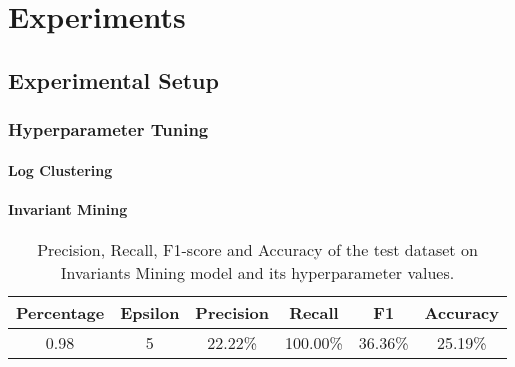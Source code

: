 \chapter{Experiments}

\section{Experimental Setup}

\subsection{Hyperparameter Tuning}
\label{appendix:hyperparameterTuning}
\subsubsection{Log Clustering}
\begin{table}[h]
\centering
{}
    \caption{Precision, Recall, F1-score and Accuracy of the test dataset on Log Clustering model with different hyperparameter values.}
    \label{tab:pca_tuning}
\end{table}

\subsubsection{Invariant Mining}

\begin{table}[h]
\centering
\begin{tabular}{@{}cccccc@{}}
\toprule
Percentage & Epsilon & \textbf{Precision} & \textbf{Recall} & \textbf{F1} & \textbf{Accuracy} \\ \midrule
0.98       & 5       & 22.22\%               & 100.00\%               & 36.36\%      & 25.19\%            
\end{tabular}
    \caption{Precision, Recall, F1-score and Accuracy of the test dataset on Invariants Mining model and its hyperparameter values.}
    \label{tab:pca_tuning}
\end{table}

